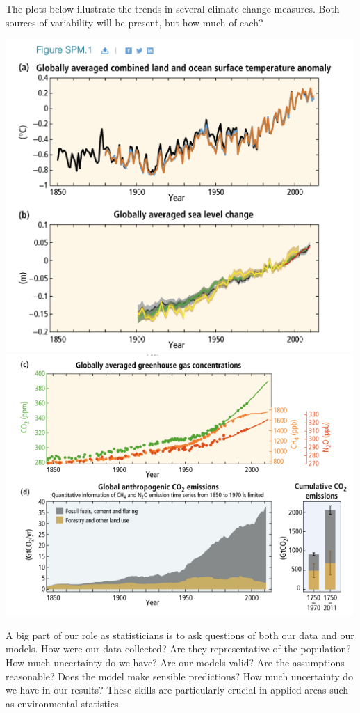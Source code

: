 \documentclass[
  letterpaper,
  DIV=11,
  numbers=noendperiod]{scrartcl}
\begin{document}
The plots below illustrate the trends in several climate change
measures. Both sources of variability will be present, but how much of
each?

\includegraphics[width=5.20833in,height=\textheight]{images/TempAndSea.png}
\includegraphics[width=5.20833in,height=\textheight]{images/GreenhouseCO2.png}

A big part of our role as statisticians is to ask questions of both our
data and our models. How were our data collected? Are they
representative of the population? How much uncertainty do we have? Are
our models valid? Are the assumptions reasonable? Does the model make
sensible predictions? How much uncertainty do we have in our results?
These skills are particularly crucial in applied areas such as
environmental statistics.
\end{document}
